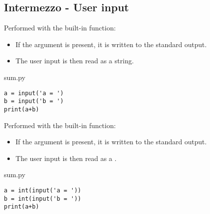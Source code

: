 \documentclass[aspectratio=1610,t]{beamer}
\begin{document}
\subsection{Intermezzo - User input}
\begin{pframe}
Performed with the  built-in function:
 \begin{itemize}
  \item If the  argument is present, it is written to the standard
        output.
  \item The user input is then read as a string.
 \end{itemize}
 \pause
 \begin{pythonfile}{sum.py}
  \begin{verbatim}
a = input('a = ')
b = input('b = ')
print(a+b)
  \end{verbatim}
 \end{pythonfile}
 \pause
 \begin{terminal}
 \end{terminal}
 \pause
\end{pframe}


\begin{pframe}
Performed with the  built-in function:
 \begin{itemize}
  \item If the  argument is present, it is written to the standard
        output.
  \item The user input is then read as a .
 \end{itemize}
 \begin{pythonfile}{sum.py}
  \begin{verbatim}
a = int(input('a = '))
b = int(input('b = '))
print(a+b)
  \end{verbatim}
 \end{pythonfile}
 \begin{terminal}
 \end{terminal}
\end{pframe}
\end{document}
